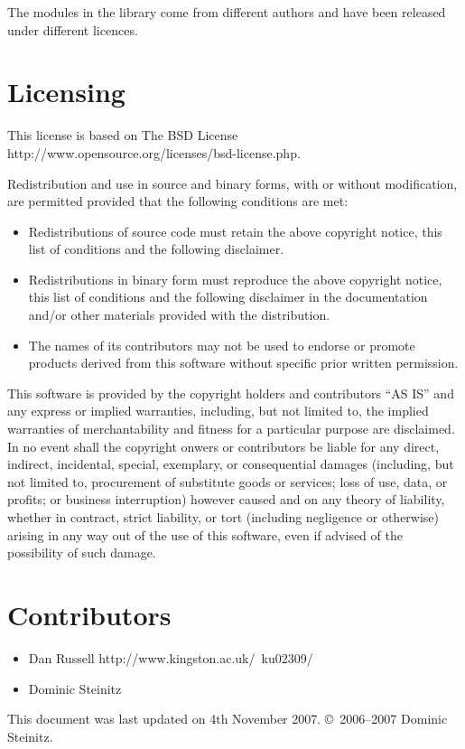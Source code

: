 \documentclass{article}
\begin{document}
The modules in the library come from different authors and have been 
released under different licences. 

\section{Licensing}

This license is based on
\htmladdnormallinkfoot
{The BSD License}
{http://www.opensource.org/licenses/bsd-license.php}.

Redistribution and use in source and binary forms, with or without 
modification, are permitted provided that the following conditions are met:

\begin{itemize}
\item
Redistributions of source code must retain the above copyright notice, 
this list of conditions and the following disclaimer.
\item
Redistributions in binary form must reproduce the above copyright notice, 
this list of conditions and the following disclaimer in the documentation 
and/or other materials provided with the distribution.
\item
The names of its contributors may not be used to endorse or promote 
products derived from this software without specific prior written permission.
\end{itemize}

\begin{sc}
This software is provided by the copyright holders and contributors ``AS IS'' 
and any express or implied warranties, including, but not limited to, 
the implied warranties of merchantability and fitness for a particular 
purpose are disclaimed. In no event shall the copyright onwers or
contributors be liable for any direct, indirect, incidental, special,
exemplary, or consequential damages (including, but not limited to,
procurement of substitute goods or services; loss of use, data, or profits;
or business interruption) however caused and on any theory of liability,
whether in contract, strict liability, or tort (including negligence or
otherwise) arising in any way out of the use of this software,
even if advised of the possibility of such damage.
\end{sc}

\section{Contributors}

\begin{itemize}

\item
\htmladdnormallinkfoot
   {Dan Russell}
   {http://www.kingston.ac.uk/~ku02309/}

\item
Dominic Steinitz

\end{itemize}

This document was last updated on 4th November 2007.
\copyright\ 2006--2007 Dominic Steinitz. 
\end{document}
